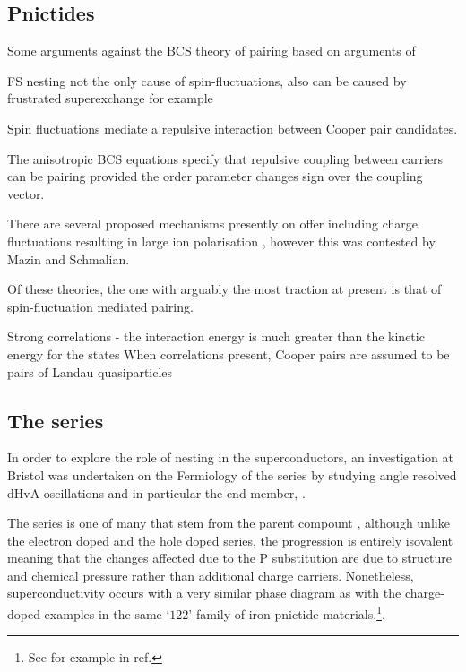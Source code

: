 \subsection{Pnictides}

Some arguments against the BCS theory of pairing \cite{Haule2008,Yndurain2009,Mazin2008} based on arguments of 

FS nesting not the only cause of spin-fluctuations, also can be caused by frustrated superexchange for example 

Spin fluctuations mediate a repulsive interaction between Cooper pair candidates.

The anisotropic BCS equations specify that repulsive coupling between carriers can be pairing provided the order parameter changes sign over the coupling vector.


There are several proposed mechanisms presently on offer including charge fluctuations resulting in large ion polarisation \cite{Berciu2009}, however this was contested by Mazin and Schmalian\cite{Mazin2009}.


Of these theories, the one with arguably the most traction at present is that of spin-fluctuation mediated pairing. 


Strong correlations - the interaction energy is much greater than the kinetic energy for the states
When correlations present, Cooper pairs are assumed to be pairs of Landau quasiparticles



\subsection{The \BaFePAs series}

In order to explore the role of nesting in the \highTc superconductors, an investigation at Bristol was undertaken on the Fermiology of the \BaFePAs series by studying angle resolved \ac{dHvA} oscillations and in particular the end-member, \BaFeP.

The \BaFePAs series is one of many that stem from the parent compount \BaFeAs, although unlike the electron doped \BaCoFeAs and the hole doped \BaKFeAs series, the \BaFePAs progression is entirely isovalent meaning that the changes affected due to the P substitution are due to structure and chemical pressure rather than additional charge carriers. Nonetheless, superconductivity occurs with a very similar phase diagram as with the charge-doped examples in the same `$122$' family of iron-pnictide materials.\footnote{See for example  in ref.\cite{Paglione2010}}. 

